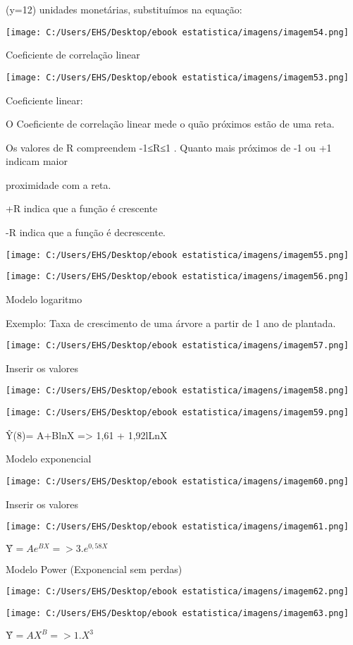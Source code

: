 \documentclass[]{book}
\begin{document}
(y=12) unidades monetárias, substituímos na equação:

\texttt{[image: C:/Users/EHS/Desktop/ebook estatistica/imagens/imagem54.png]}

Coeficiente de correlação linear

\texttt{[image: C:/Users/EHS/Desktop/ebook estatistica/imagens/imagem53.png]}

Coeficiente linear:

O Coeficiente de correlação linear mede o quão próximos estão de uma reta.

Os valores de R compreendem -1≤R≤1 . Quanto mais próximos de -1 ou +1 indicam maior

proximidade com a reta.

+R indica que a função é crescente

-R indica que a função é decrescente.

\texttt{[image: C:/Users/EHS/Desktop/ebook estatistica/imagens/imagem55.png]}

\texttt{[image: C:/Users/EHS/Desktop/ebook estatistica/imagens/imagem56.png]}

Modelo logaritmo

Exemplo: Taxa de crescimento de uma árvore a partir de 1 ano de plantada.

\texttt{[image: C:/Users/EHS/Desktop/ebook estatistica/imagens/imagem57.png]}

Inserir os valores

\texttt{[image: C:/Users/EHS/Desktop/ebook estatistica/imagens/imagem58.png]}

\texttt{[image: C:/Users/EHS/Desktop/ebook estatistica/imagens/imagem59.png]}

Ŷ(8)= A+BlnX =\textgreater{} 1,61 + 1,92lLnX

Modelo exponencial

\texttt{[image: C:/Users/EHS/Desktop/ebook estatistica/imagens/imagem60.png]}

Inserir os valores

\texttt{[image: C:/Users/EHS/Desktop/ebook estatistica/imagens/imagem61.png]}

\(Ŷ= Ae^{BX} => 3.e^{0,58X}\)

Modelo Power (Exponencial sem perdas)

\texttt{[image: C:/Users/EHS/Desktop/ebook estatistica/imagens/imagem62.png]}

\texttt{[image: C:/Users/EHS/Desktop/ebook estatistica/imagens/imagem63.png]}

\(Ŷ= AX^{B} => 1.X^{3}\)
\end{document}
